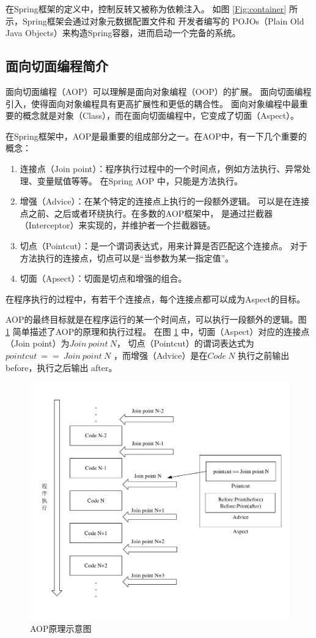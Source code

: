 在Spring框架的定义中，控制反转又被称为依赖注入。
如图 \ref{Fig:container} 所示，Spring框架会通过对象元数据配置文件和
开发者编写的 POJOs（Plain Old Java Objects）来构造Spring容器，进而启动一个完备的系统。

\subsection{面向切面编程简介}
面向切面编程（AOP）可以理解是面向对象编程（OOP）的扩展。
面向切面编程引入，使得面向对象编程具有更高扩展性和更低的耦合性。
面向对象编程中最重要的概念就是对象（Class），而在面向切面编程中，它变成了切面（Aspect）。

在Spring框架中，AOP是最重要的组成部分之一。在AOP中，有一下几个重要的概念：
\begin{enumerate}
    \item 连接点（Join point）：程序执行过程中的一个时间点，例如方法执行、异常处理、变量赋值等等。
    在Spring AOP 中，只能是方法执行。
    \item 增强（Advice）：在某个特定的连接点上执行的一段额外逻辑。
    可以是在连接点之前、之后或者环绕执行。在多数的AOP框架中，
    是通过拦截器（Interceptor）来实现的，并维护者一个拦截器链。
    \item 切点（Pointcut）：是一个谓词表达式，用来计算是否匹配这个连接点。
    对于方法执行的连接点，切点可以是“当参数为某一指定值”。
    \item 切面（Apsect）：切面是切点和增强的组合。
\end{enumerate}

在程序执行的过程中，有若干个连接点，每个连接点都可以成为Aspect的目标。

AOP的最终目标就是在程序运行的某一个时间点，可以执行一段额外的逻辑。图 \ref{Fig:aop} 
简单描述了AOP的原理和执行过程。
在图 \ref{Fig:aop} 中，切面（Aspect）对应的连接点（Join point）为$Join\ point\ N$，
切点（Pointcut）的谓词表达式为$ pointcut\ ==\ Join\ point\ N$
，而增强（Advice）是在$Code\ N$ 执行之前输出 before，执行之后输出 after。

\begin{figure}[ht]
    \centering   
    \includegraphics[width=0.8\linewidth]{./Figure/IMG_aop.pdf}
    \caption{AOP原理示意图}\label{Fig:aop}
\end{figure}


